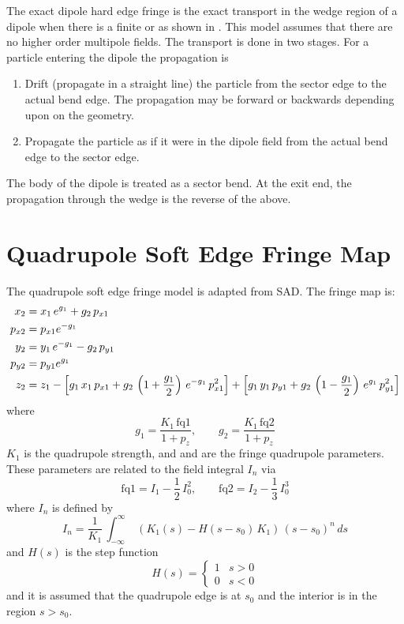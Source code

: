 The exact dipole hard edge fringe is the exact transport in the wedge region of a dipole when there
is a finite  or  as shown in . This model assumes that there are no
higher order multipole fields. The transport is done in two stages. For a particle entering the
dipole the propagation is
\begin{enumerate}
\item
Drift (propagate in a straight line) the particle from the sector edge to the actual bend edge. The
propagation may be forward or backwards depending upon on the geometry.
%
\item
Propagate the particle as if it were in the dipole field from the actual bend edge to the sector
edge.
\end{enumerate}
The body of the dipole is treated as a sector bend. At the exit end, the propagation through the
wedge is the reverse of the above.

\section{Quadrupole Soft Edge Fringe Map}
\label{s:q.soft}

The quadrupole soft edge fringe model is adapted from SAD\cite{b:sad}. The fringe map is:
\begin{align}
  x_2 &= x_1 \, e^{g_1} + g_2 \, p_{x1} \nonumber \\
  p_{x2} &= p_{x1} e^{-g_1} \nonumber \\
  y_2 &= y_1 \, e^{-g_1} - g_2 \, p_{y1} \\
  p_{y2} &= p_{y1} e^{g_1} \nonumber \\
  z_2 &= z_1 - 
    \left[g_1 \, x_1 \, p_{x1} + g_2 \, \left( 1 + \frac{g_1}{2} \right)
    \, e^{-g_1} \, p_{x1}^2 \right] + 
    \left[g_1 \, y_1 \, p_{y1} + g_2 \, \left( 1 - \frac{g_1}{2} \right)
    \, e^{g_1} \, p_{y1}^2 \right] \nonumber
\end{align}
where
\begin{equation}
  g_1 = \frac{K_1 \, \text{fq1}}{1 + p_z} , \qquad
  g_2 = \frac{K_1 \, \text{fq2}}{1 + p_z}
\end{equation}
$K_1$ is the quadrupole strength, and  and  are the fringe
quadrupole parameters. These parameters are related to the field integral $I_n$
via
\begin{equation}
  \text{fq1} = I_1 - \frac{1}{2} \, I_0^2 , \qquad
  \text{fq2} = I_2 - \frac{1}{3} \, I_0^3
\end{equation}
where $I_n$ is defined by
\begin{equation}
  I_n = \frac{1}{K_1} \, \int_{-\infty}^{\infty} \; 
    (K_1(s) - H(s-s_0) \, K_1) \, (s - s_0)^n \, ds
\end{equation}
and $H(s)$ is the step function
\begin{equation}
  H(s) = \begin{cases}
    1   & s > 0 \\
    0   & s < 0
  \end{cases}
\end{equation}
and it is assumed that the quadrupole edge is at $s_0$ and the interior is 
in the region $s > s_0$. 

